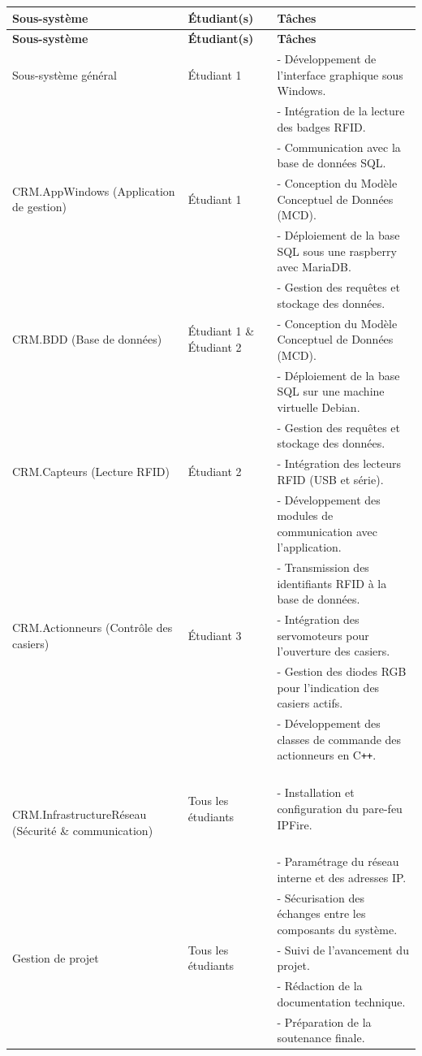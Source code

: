 \documentclass[main.tex]{subfiles}
\begin{document}
\begin{longtable}{|p{4.2cm}|p{3.2cm}|p{7.2cm}|}
\hline
\textbf{Sous-système} & \textbf{Étudiant(s)} & \textbf{Tâches} \\
\hline
\endfirsthead
\hline
\textbf{Sous-système} & \textbf{Étudiant(s)} & \textbf{Tâches} \\
\hline
\endhead

Sous-système général & Étudiant 1 & 
- Développement de l’interface graphique sous Windows.\\
& & - Intégration de la lecture des badges RFID.\\
& & - Communication avec la base de données SQL. \\
\hline

CRM.AppWindows (Application de gestion) & Étudiant 1 & 
- Conception du Modèle Conceptuel de Données (MCD). \\
& & - Déploiement de la base SQL sous une raspberry avec MariaDB.\\
& & - Gestion des requêtes et stockage des données. \\
\hline

CRM.BDD (Base de données) & Étudiant 1 \& Étudiant 2 & 
- Conception du Modèle Conceptuel de Données (MCD).\\
& & - Déploiement de la base SQL sur une machine virtuelle Debian.\\
& & - Gestion des requêtes et stockage des données.\\
\hline

CRM.Capteurs (Lecture RFID) & Étudiant 2 & 
- Intégration des lecteurs RFID (USB et série).\\
& & - Développement des modules de communication avec l’application.\\
& & - Transmission des identifiants RFID à la base de données.\\
\hline

CRM.Actionneurs (Contrôle des casiers) & Étudiant 3 & 
- Intégration des servomoteurs pour l’ouverture des casiers.\\
& & - Gestion des diodes RGB pour l’indication des casiers actifs.\\
& & - Développement des classes de commande des actionneurs en C\texttt{++}.\\
\hline \

CRM.InfrastructureRéseau (Sécurité \& communication) & Tous les étudiants & 
- Installation et configuration du pare-feu IPFire. \\
& & - Paramétrage du réseau interne et des adresses IP.\\
& & - Sécurisation des échanges entre les composants du système.\\
\hline

Gestion de projet & Tous les étudiants & 
- Suivi de l’avancement du projet.\\
& & - Rédaction de la documentation technique.\\
& & - Préparation de la soutenance finale.\\
\hline

\end{longtable}
\end{document}
